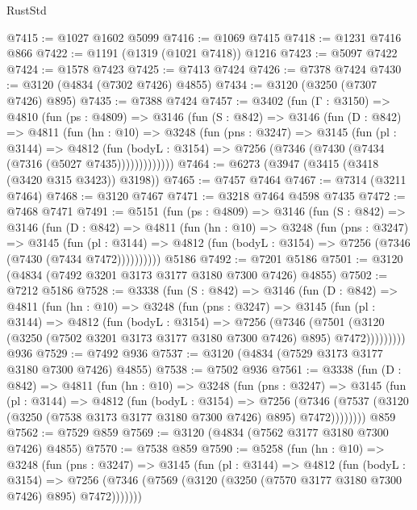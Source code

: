 \begin{lexlean}{RustStd}
\begin{coremodule}
@7415 := @1027 @1602 @5099
@7416 := @1069 @7415
@7418 := @1231 @7416 @866
@7422 := @1191 (@1319 (@1021 @7418)) @1216
@7423 := @5097 @7422
@7424 := @1578 @7423
@7425 := @7413 @7424
@7426 := @7378 @7424
@7430 := @3120 (@4834 (@7302 @7426) @4855)
@7434 := @3120 (@3250 (@7307 @7426) @895)
@7435 := @7388 @7424
@7457 := @3402
    (fun (Γ : @3150) =>
    @4810
      (fun (ps : @4809) =>
      @3146
        (fun (S : @842) =>
        @3146
          (fun (D : @842) =>
          @4811
            (fun (hn : @10) =>
            @3248
              (fun (pns : @3247) =>
              @3145
                (fun (pl : @3144) =>
                @4812
                  (fun (bodyL : @3154) =>
                  @7256 (@7346 (@7430 (@7434 (@7316 (@5027 @7435)))))))))))))
@7464 := @6273 (@3947 (@3415 (@3418 (@3420 @315 @3423)) @3198))
@7465 := @7457 @7464
@7467 := @7314 (@3211 @7464)
@7468 := @3120 @7467
@7471 := @3218 @7464 @4598 @7435
@7472 := @7468 @7471
@7491 := @5151
    (fun (ps : @4809) =>
    @3146
      (fun (S : @842) =>
      @3146
        (fun (D : @842) =>
        @4811
          (fun (hn : @10) =>
          @3248
            (fun (pns : @3247) =>
            @3145
              (fun (pl : @3144) =>
              @4812 (fun (bodyL : @3154) => @7256 (@7346 (@7430 (@7434 @7472))))))))))
    @5186
@7492 := @7201 @5186
@7501 := @3120 (@4834 (@7492 @3201 @3173 @3177 @3180 @7300 @7426) @4855)
@7502 := @7212 @5186
@7528 := @3338
    (fun (S : @842) =>
    @3146
      (fun (D : @842) =>
      @4811
        (fun (hn : @10) =>
        @3248
          (fun (pns : @3247) =>
          @3145
            (fun (pl : @3144) =>
            @4812
              (fun (bodyL : @3154) =>
              @7256
                (@7346
                  (@7501
                    (@3120 (@3250 (@7502 @3201 @3173 @3177 @3180 @7300 @7426) @895) @7472)))))))))
    @936
@7529 := @7492 @936
@7537 := @3120 (@4834 (@7529 @3173 @3177 @3180 @7300 @7426) @4855)
@7538 := @7502 @936
@7561 := @3338
    (fun (D : @842) =>
    @4811
      (fun (hn : @10) =>
      @3248
        (fun (pns : @3247) =>
        @3145
          (fun (pl : @3144) =>
          @4812
            (fun (bodyL : @3154) =>
            @7256
              (@7346 (@7537 (@3120 (@3250 (@7538 @3173 @3177 @3180 @7300 @7426) @895) @7472))))))))
    @859
@7562 := @7529 @859
@7569 := @3120 (@4834 (@7562 @3177 @3180 @7300 @7426) @4855)
@7570 := @7538 @859
@7590 := @5258
    (fun (hn : @10) =>
    @3248
      (fun (pns : @3247) =>
      @3145
        (fun (pl : @3144) =>
        @4812
          (fun (bodyL : @3154) =>
          @7256 (@7346 (@7569 (@3120 (@3250 (@7570 @3177 @3180 @7300 @7426) @895) @7472)))))))

\end{coremodule}
\end{lexlean}
